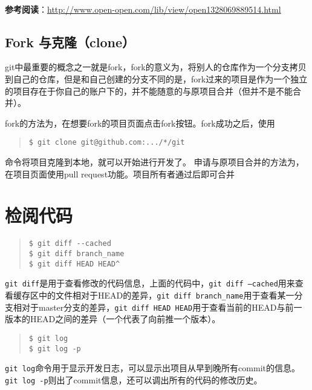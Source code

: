 \documentclass{article}
\begin{document}
			~\\\noindent\textbf{参考阅读}：\url{http://www.open-open.com/lib/view/open1328069889514.html}
		\subsection{Fork 与克隆（clone）} %
		\label{sub:fork_与克隆_clone_}
			git中最重要的概念之一就是fork，fork的意义为，将别人的仓库作为一个分支拷贝到自己的仓库，但是和自己创建的分支不同的是，fork过来的项目是作为一个独立的项目存在于你自己的账户下的，并不能随意的与原项目合并（但并不是不能合并）。
			\par fork的方法为，在想要fork的项目页面点击fork按钮。fork成功之后，使用
			\begin{quote}
				\begin{lstlisting}
$ git clone git@github.com:.../*/git
				\end{lstlisting}
			\end{quote}
			命令将项目克隆到本地，就可以开始进行开发了。
			申请与原项目合并的方法为，在项目页面使用pull request功能。项目所有者通过后即可合并
	\section{检阅代码} %
	\label{sec:检阅代码}
		\begin{quote}
			\begin{lstlisting}
$ git diff --cached
$ git diff branch_name
$ git diff HEAD HEAD^
			\end{lstlisting}
		\end{quote}
		\par{\tt git diff}是用于查看修改的代码信息，上面的代码中，{\tt git diff --cached}用来查看缓存区中的文件相对于HEAD的差异，{\tt git diff branch\_name}用于查看某一分支相对于master分支的差异，{\tt git diff HEAD HEAD$\hat{}$}用于查看当前的HEAD与前一版本的HEAD之间的差异（一个$\hat{}$代表了向前推一个版本）。
		\begin{quote}
			\begin{lstlisting}
$ git log
$ git log -p
			\end{lstlisting}
		\end{quote}
		\par{\tt git log}命令用于显示开发日志，可以显示出项目从早到晚所有commit的信息。{\tt git log -p}则出了commit信息，还可以调出所有的代码的修改历史。
\end{document}
